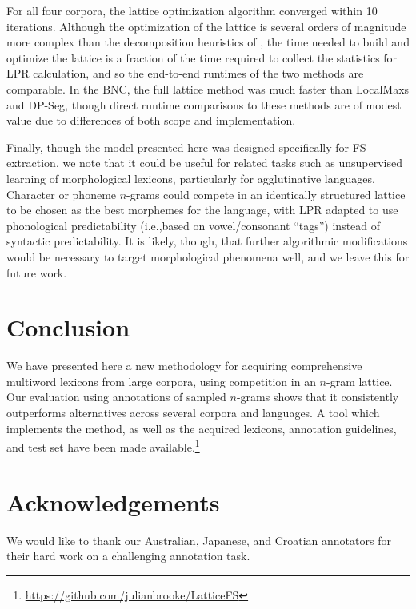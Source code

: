 \documentclass[11pt,letterpaper]{article}
\makeatletter
\def \ie {i.e.,\@ }
\makeatother
\begin{document}
For all four corpora, the lattice optimization algorithm converged within 10 iterations.  Although the optimization of the lattice is several orders of magnitude more complex than the decomposition heuristics of , the time needed to build and optimize the lattice is a fraction of the time required to collect the statistics for LPR calculation, and so the end-to-end runtimes of the two methods are comparable. In the BNC, the full lattice method was much faster than LocalMaxs and DP-Seg, though direct runtime comparisons to these methods are of modest value due to differences of both scope and implementation.



Finally, though the model presented here was designed specifically for FS extraction, we note that it could be useful for related tasks such as unsupervised learning of morphological lexicons, particularly for agglutinative languages. Character or phoneme $n$-grams could compete in an identically structured lattice to be chosen as the best morphemes for the language, with LPR adapted to use phonological predictability (\ie based on vowel/consonant ``tags'') instead of syntactic predictability. It is likely, though, that further algorithmic modifications would be necessary to target morphological phenomena well, and we leave this for future work.

\section{Conclusion}

We have presented here a new methodology for acquiring comprehensive multiword lexicons from large corpora, using competition in an $n$-gram lattice. Our evaluation using annotations of sampled $n$-grams shows that it consistently outperforms alternatives across several corpora and languages. A tool which implements the method, as well as the acquired lexicons, annotation guidelines, and test set have been made available.\footnote{\url{https://github.com/julianbrooke/LatticeFS}}

\section*{Acknowledgements}

We would like to thank our Australian, Japanese, and Croatian annotators for their hard work on a challenging annotation task.



\end{document}
